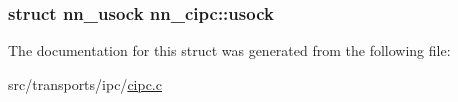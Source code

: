 \subsubsection[{usock}]{\setlength{\rightskip}{0pt plus 5cm}struct {\bf nn\+\_\+usock} nn\+\_\+cipc\+::usock}\hypertarget{structnn__cipc_a61f984db042983502c3d270326bd89d8}{}\label{structnn__cipc_a61f984db042983502c3d270326bd89d8}


The documentation for this struct was generated from the following file\+:\begin{DoxyCompactItemize}
\item 
src/transports/ipc/\hyperlink{cipc_8c}{cipc.\+c}\end{DoxyCompactItemize}
